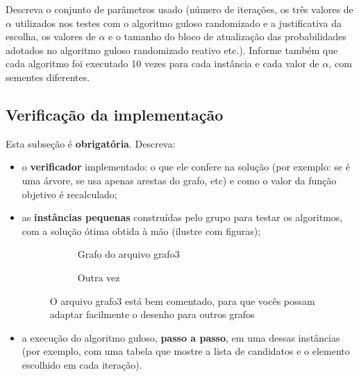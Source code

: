 \documentclass[12pt]{article}
\begin{document}
Descreva o conjunto de parâmetros usado (número de iterações, os três valores de $\alpha$ utilizados nos testes com o algoritmo guloso randomizado e a justificativa da escolha, os valores de $\alpha$ e o tamanho do bloco de atualização das probabilidades adotados no algoritmo guloso randomizado reativo etc.). Informe também que cada algoritmo foi executado 10 vezes para cada instância e cada valor de $\alpha$, com sementes diferentes.

\subsection{Verificação da implementação}
\label{subSecVerificacao}

Esta subseção é \textbf{obrigatória}. Descreva:
\begin{itemize}
    \item o \textbf{verificador} implementado: o que ele confere na solução (por exemplo: se é uma árvore, se usa apenas arestas do grafo, etc) e como o valor da função objetivo é recalculado;
    \item as \textbf{instâncias pequenas} construídas pelo grupo para testar os algoritmos, com a solução ótima obtida à mão (ilustre com figuras);
    
\begin{figure}[ht!]
  \centering
  \begin{subfigure}{0.45\textwidth}
    \centering
    \resizebox{0.9\textwidth}{!}{ 
    
    }
    \caption{Grafo do arquivo grafo3}
    \label{fig:grafo3a_secao4}
  \end{subfigure}
  \hfill
  \begin{subfigure}{0.45\textwidth}
    \centering
    \resizebox{0.9\textwidth}{!}{
    
    }
    \caption{Outra vez}
    \label{fig:grafo3b_secao4}
  \end{subfigure}
  
  \caption{O arquivo grafo3 está bem comentado, para que vocês possam adaptar facilmente o desenho para outros grafos}
  \label{fig:grafo3_secao4}
\end{figure}

    \item a execução do algoritmo guloso, \textbf{passo a passo}, em uma dessas instâncias (por exemplo, com uma tabela que mostre a lista de candidatos e o elemento escolhido em cada iteração).
\end{itemize}
\end{document}
